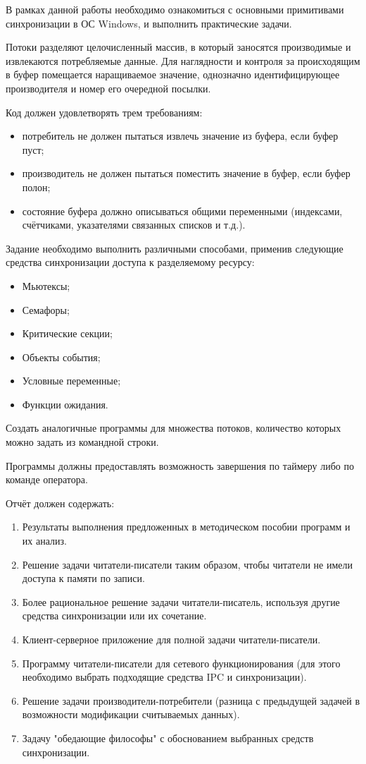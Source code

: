 \documentclass[a4paper, 12pt]{article}		%
\begin{document}
В рамках данной работы необходимо ознакомиться с основными примитивами синхронизации в ОС Windows, и выполнить практические задачи.
\vspace{1em}

Потоки разделяют целочисленный массив, в который заносятся производимые и извлекаются потребляемые данные. Для наглядности и контроля за происходящим в буфер помещается наращиваемое значение, однозначно идентифицирующее производителя и номер его очередной посылки.

Код должен удовлетворять трем требованиям:
\begin{itemize}
\item потребитель не должен пытаться извлечь значение из буфера, если буфер пуст;
\item производитель не должен пытаться поместить значение в буфер, если буфер полон;
\item состояние буфера должно описываться общими переменными (индексами, счётчиками, указателями связанных списков и т.д.).
\end{itemize}

Задание необходимо выполнить различными способами, применив следующие средства синхронизации доступа к разделяемому ресурсу:
\begin{itemize}
\item Мьютексы;
\item Семафоры;
\item Критические секции;
\item Объекты события;
\item Условные переменные;
\item Функции ожидания.
\end{itemize}

Создать аналогичные программы для множества потоков, количество которых можно задать из командной строки.

Программы должны предоставлять возможность завершения по таймеру либо по команде оператора.
\vspace{3em}

Отчёт должен содержать:
\begin{enumerate}
\item Результаты выполнения предложенных в методическом пособии программ и их анализ.
\item Решение задачи читатели-писатели таким образом, чтобы читатели не имели доступа к памяти по записи.
\item Более рациональное решение задачи читатели-писатель, используя другие средства синхронизации или их сочетание.
\item Клиент-серверное приложение для полной задачи читатели-писатели.
\item Программу читатели-писатели для сетевого функционирования (для этого необходимо выбрать подходящие средства IPC и синхронизации).
\item Решение задачи производители-потребители (разница с предыдущей задачей в возможности модификации считываемых данных).
\item Задачу "обедающие философы" с обоснованием выбранных средств синхронизации.
\end{enumerate}
\end{document}
